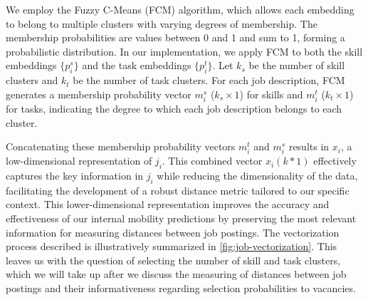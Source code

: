 \documentclass[12pt]{article}
\begin{document}
We employ the Fuzzy C-Means (FCM) algorithm, which allows each embedding to belong to multiple clusters with varying degrees of membership. The membership probabilities are values between 0 and 1 and sum to 1, forming a probabilistic distribution. In our implementation, we apply FCM to both the skill embeddings \(\{p_i^s\}\) and the task embeddings \(\{p_i^t\}\). Let \(k_s\) be the number of skill clusters and \(k_t\) be the number of task clusters. For each job description, FCM generates a membership probability vector \(m_i^s\) (\(k_s \times 1\)) for skills and \(m_i^t\) (\(k_t \times 1\)) for tasks, indicating the degree to which each job description belongs to each cluster.

Concatenating these membership probability vectors \(m_i^t\) and \(m_i^s\) results in \(x_i\), a low-dimensional representation of \(j_i\). This combined vector \(x_i (k * 1)\) effectively captures the key information in \(j_i\) while reducing the dimensionality of the data, facilitating the development of a robust distance metric tailored to our specific context. This lower-dimensional representation improves the accuracy and effectiveness of our internal mobility predictions by preserving the most relevant information for measuring distances between job postings. The vectorization process described is illustratively summarized in \autoref{fig:job-vectorization}. This leaves us with the question of selecting the number of skill and task clusters, which we will take up after we discuss the measuring of distances between job postings and their informativeness regarding selection probabilities to vacancies. 
\end{document}
